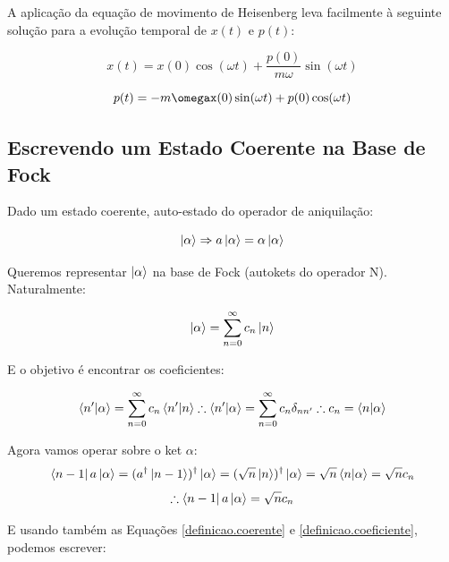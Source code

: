 \documentclass[12pt,a4paper]{report}
\begin{document}
A aplicação da equação de movimento de Heisenberg leva facilmente à seguinte solução para a evolução temporal de $x(t)$ e $p(t)$:

\begin{equation}
    x(t)=x(0)\cos(\omega t)+\frac{p(0)}{m\omega}\sin(\omega t)    
\end{equation}

\begin{equation}
    p(t)=-m\omegax(0)\sin(\omega t)+p(0)\cos(\omega t)    
\end{equation}

\subsection{Escrevendo um Estado Coerente na Base de Fock}

Dado um estado coerente, auto-estado do operador de aniquilação:

\begin{equation}
    \ket{\alpha} \Rightarrow a\ket{\alpha}=\alpha\ket{\alpha}
    \label{definicao.coerente}
\end{equation}

Queremos representar $\ket{\alpha}$ na base de Fock (autokets do operador N). Naturalmente:

\begin{equation}
    \ket{\alpha}=\sum_{n=0}^{\infty}c_n\ket{n}
\end{equation}

E o objetivo é encontrar os coeficientes:

\begin{equation}
        \braket{n'}{\alpha}=\sum_{n=0}^{\infty}c_n\braket{n'}{n}\therefore \braket{n'}{\alpha}=\sum_{n=0}^{\infty}c_n\delta_{nn'}  \therefore  c_n=\braket{n}{\alpha}
        \label{definicao.coeficiente}
\end{equation}

Agora vamos operar sobre o ket $\alpha$:
\begin{equation*}
    \bra{n-1}a\ket{\alpha}=(a^{\dag}\ket{n-1})^{\dag}\ket{\alpha}=(\sqrt{n}\ket{n})^{\dag}\ket{\alpha}=\sqrt{n}\braket{n}{\alpha}=\sqrt{n}c_n
\end{equation*}
\begin{equation}
    \therefore\bra{n-1}a\ket{\alpha}=\sqrt{n}c_n
\end{equation}

E usando também as Equações \ref{definicao.coerente} e \ref{definicao.coeficiente}, podemos escrever:
\end{document}
